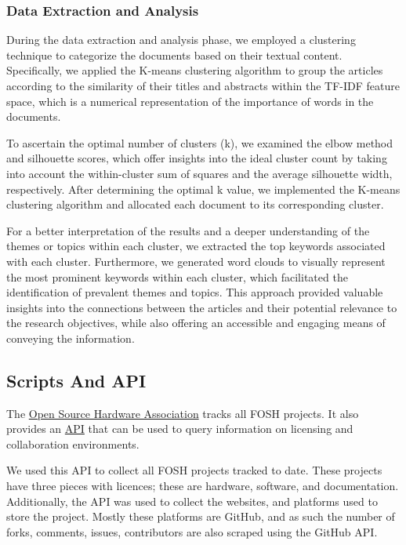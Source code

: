 \documentclass[final-report.tex]{subfiles}
\begin{document}
\subsubsection{Data Extraction and Analysis}
During the data extraction and analysis phase, we employed a clustering technique to categorize the documents based on their textual content. 
Specifically, we applied the K-means clustering algorithm to group the articles according to the similarity of their titles and abstracts within the TF-IDF feature space, which is a numerical representation of the importance of words in the documents.

To ascertain the optimal number of clusters (k), we examined the elbow method and silhouette scores, which offer insights into the ideal cluster count by taking into account the within-cluster sum of squares and the average silhouette width, respectively. 
After determining the optimal k value, we implemented the K-means clustering algorithm and allocated each document to its corresponding cluster.

For a better interpretation of the results and a deeper understanding of the themes or topics within each cluster, we extracted the top keywords associated with each cluster. 
Furthermore, we generated word clouds to visually represent the most prominent keywords within each cluster, which facilitated the identification of prevalent themes and topics. 
This approach provided valuable insights into the connections between the articles and their potential relevance to the research objectives, while also offering an accessible and engaging means of conveying the information.

\subsection{Scripts And API}

The 
\href{https://www.oshwa.org/}{Open Source Hardware Association} 
tracks all FOSH projects. 
It also provides an 
\href{https://certificationapi.oshwa.org/documentation}{API}
that can be used to query information on licensing and collaboration environments.

We used this API to collect all FOSH projects tracked to date.
These projects have three pieces with licences; these are hardware, software, and documentation. 
Additionally, the API was used to collect the websites, and platforms used to store the project. 
Mostly these platforms are GitHub, and as such the number of forks, comments, issues, contributors are also scraped using the GitHub API. 
\end{document}
